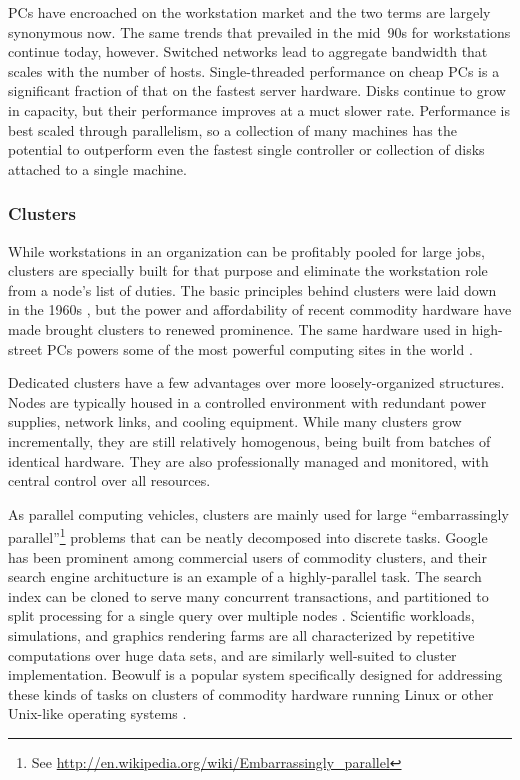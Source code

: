 PCs have encroached on the workstation market and the two terms are largely synonymous now. The same trends that prevailed in the mid~90s for workstations continue today, however. Switched networks lead to aggregate bandwidth that scales with the number of hosts. Single-threaded performance on cheap PCs is a significant fraction of that on the fastest server hardware. Disks continue to grow in capacity, but their performance improves at a muct slower rate. Performance is best scaled through parallelism, so a collection of many machines has the potential to outperform even the fastest single controller or collection of disks attached to a single machine.

\subsubsection{Clusters}

While workstations in an organization can be profitably pooled for large jobs, clusters are specially built for that purpose and eliminate the workstation role from a node's list of duties. The basic principles behind clusters were laid down in the 1960s \cite{amdahl}, but the power and affordability of recent commodity hardware have made brought clusters to renewed prominence. The same hardware used in high-street PCs powers some of the most powerful computing sites in the world \cite{top500}.

Dedicated clusters have a few advantages over more loosely-organized structures. Nodes are typically housed in a controlled environment with redundant power supplies, network links, and cooling equipment. While many clusters grow incrementally, they are still relatively homogenous, being built from batches of identical hardware. They are also professionally managed and monitored, with central control over all resources.

As parallel computing vehicles, clusters are mainly used for large ``embarrassingly parallel''\footnote{See \url{http://en.wikipedia.org/wiki/Embarrassingly_parallel}} problems that can be neatly decomposed into discrete tasks. Google has been prominent among commercial users of commodity clusters, and their search engine architucture is an example of a highly-parallel task. The search index can be cloned to serve many concurrent transactions, and partitioned to split processing for a single query over multiple nodes \cite{barroso}. Scientific workloads, simulations, and graphics rendering farms are all characterized by repetitive computations over huge data sets, and are similarly well-suited to cluster implementation. Beowulf is a popular system specifically designed for addressing these kinds of tasks on clusters of commodity hardware running Linux or other Unix-like operating systems \cite{ridge}.

